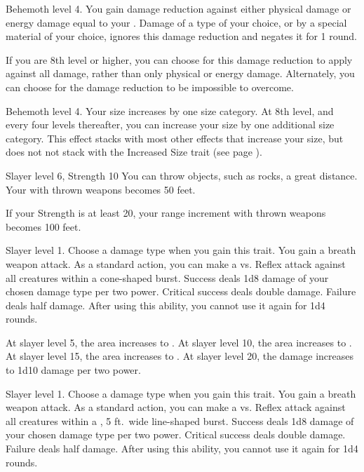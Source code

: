     \featpre Behemoth level 4.
    \featben You gain damage reduction against either physical damage or energy damage equal to your .
    Damage of a type of your choice, or by a special material of your choice, ignores this damage reduction and negates it for 1 round.

    If you are 8th level or higher, you can choose for this damage reduction to apply against all damage, rather than only physical or energy damage.
    Alternately, you can choose for the damage reduction to be impossible to overcome.

    \featpre Behemoth level 4.
    \featben Your size increases by one size category.
    At 8th level, and every four levels thereafter, you can increase your size by one additional size category.
    This effect stacks with most other effects that increase your size, but does not not stack with the Increased Size trait (see page ).

    \featpre Slayer level 6, Strength 10
    \featben You can throw objects, such as rocks, a great distance.
    Your  with thrown weapons becomes 50 feet.

    If your Strength is at least 20, your range increment with thrown weapons becomes 100 feet.

    \featpre Slayer level 1.
     Choose a damage type when you gain this trait.
    \featben You gain a breath weapon attack.
    As a standard action, you can make a  vs. Reflex attack against all creatures within a \areasmall cone-shaped burst.
    Success deals 1d8 damage of your chosen damage type per two power.
    Critical success deals double damage.
    Failure deals half damage.
    After using this ability, you cannot use it again for 1d4 rounds.

    At slayer level 5, the area increases to \areamed.
    At slayer level 10, the area increases to \arealarge.
    At slayer level 15, the area increases to \areahuge.
    At slayer level 20, the damage increases to 1d10 damage per two power.

    \featpre Slayer level 1.
     Choose a damage type when you gain this trait.
    \featben You gain a breath weapon attack.
    As a standard action, you can make a  vs. Reflex attack against all creatures within a \areamed, 5 ft.\ wide line-shaped burst.
    Success deals 1d8 damage of your chosen damage type per two power.
    Critical success deals double damage.
    Failure deals half damage.
    After using this ability, you cannot use it again for 1d4 rounds.

